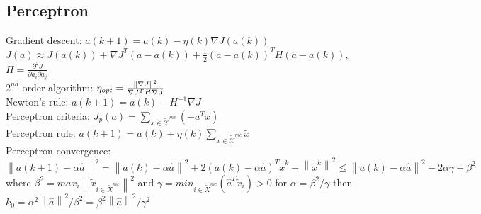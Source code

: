 \subsection*{Perceptron} 
Gradient descent: $a(k+1) = a(k) - \eta(k)\nabla J(a(k))$ \\
$J(a)\approx J(a(k))+\nabla J^T(a-a(k)) + \tfrac{1}{2}(a-a(k))^T H (a-a(k))$, $H{=}\frac{\partial^2 J}{\partial a_i \partial a_j}$ \\
$2^{nd}$ order algorithm: $\eta_{opt} = \frac{\left\lVert\nabla J\right\rVert^2}{\nabla J^T H \nabla J}$ \\
Newton's rule: $a(k+1){=}a(k){-}H^{{-}1}\nabla J$\\
Perceptron criteria: $J_p(a)=\sum_{\widetilde{x}\in\widetilde{\mathcal{X}}^{mc}} (-a^T \widetilde{x})$ \\
Perceptron rule: $a(k+1)=a(k)+\eta(k)\sum_{\widetilde{x}\in\widetilde{\mathcal{X}}^{mc}} \widetilde{x}$ \\
Perceptron convergence:$\left \| a(k+1)- \alpha \hat a \right \|^{2} = \left \| a(k)- \alpha \hat a \right \|^{2}  + 2(a(k)- \alpha \hat a)^{T} \tilde x^{k} + \left \| \tilde x^{k} \right \|^{2} \leq \left \| a(k)- \alpha \hat a \right \|^{2} -2\alpha \gamma + \beta ^{2}$
where $\beta^{2} = max_{i}  \left \| \tilde x_{i \in \tilde X^{mc} } \right \| ^{2}$ and $\gamma = min_{i \in \tilde X^{mc} } (\hat a^{T} \tilde x_{i}) > 0 $ for $\alpha= \beta^{2} / \gamma$  then $k_{0}= \alpha^{2}\left \|\hat a \right \|^{2} / \beta^{2}=  \beta^{2}\left \|\hat a \right \|^{2} / \gamma^{2}$
